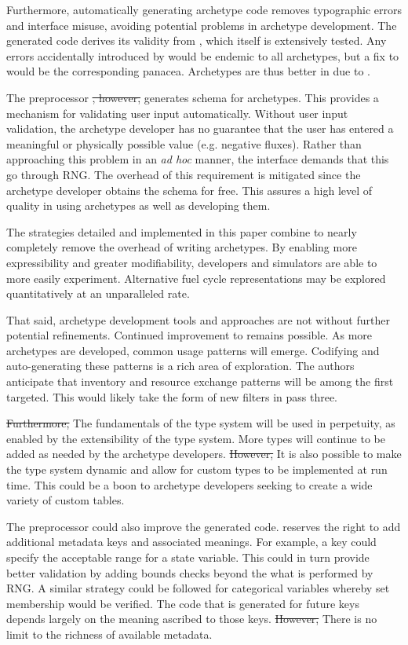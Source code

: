 Furthermore, automatically generating archetype code removes typographic errors and 
\cyclus interface misuse, avoiding potential problems in archetype development. The 
generated code derives its validity from \cycpp, which itself is extensively 
tested. Any errors accidentally introduced by \cycpp would be endemic to all archetypes, 
but a fix to \cycpp would be the corresponding panacea. Archetypes are thus 
better in \cyclus due to \cycpp.

The preprocessor \sout{, however,} generates schema for archetypes. This provides a mechanism 
for validating user input automatically.  Without user input validation, the archetype 
developer has no guarantee that the user has entered a meaningful or physically possible 
value (e.g. negative fluxes). Rather than approaching this problem in an \emph{ad hoc}
manner, the \cyclus interface demands that this go through \acrlong{RNG}.  The overhead 
of this requirement is mitigated since the archetype developer obtains the schema
for free. This assures a high level of quality in using archetypes as well as 
developing them.

The strategies detailed and implemented in this paper combine to nearly completely 
remove the overhead of writing archetypes. By enabling more expressibility and greater
modifiability, developers and simulators are able to more easily experiment.  
Alternative fuel cycle representations may be explored quantitatively at an
unparalleled rate.

That said, archetype development tools and approaches are not without further 
potential refinements. Continued improvement to \cycpp remains possible. As more 
archetypes are developed, common usage patterns will emerge. Codifying and 
auto-generating these patterns is a rich area of exploration. The authors anticipate 
that inventory and resource exchange patterns will be among the first targeted.
This would likely take the form of new filters in pass three.

\sout{Furthermore, } The fundamentals of the \cyclus type system will be used in perpetuity, as enabled by the extensibility of the type system.  More types will continue to 
be added as needed by the archetype developers.  \sout{However,} It is also possible to 
make the type system dynamic and allow for custom types to be implemented at run time.
This could be a boon to archetype developers seeking to create a wide variety of custom
tables.

The preprocessor could also improve the generated code. \Cyclus reserves the right
to add additional metadata keys and associated meanings.  For example, a 
key could specify the acceptable range for a state variable. This could in turn 
provide better validation by adding bounds checks beyond the what is performed
by \gls{RNG}. A similar strategy could be followed for categorical variables whereby
set membership would be verified. The code that is generated for future keys 
depends largely on the meaning ascribed to those keys. \sout{However, } There is no limit 
to the richness of available metadata.

